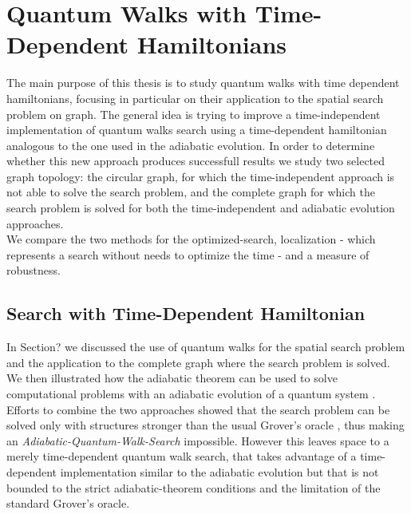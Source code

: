 \newpage
\thispagestyle{empty}
\chapter{Quantum Walks with Time-Dependent Hamiltonians}
The main purpose of this thesis is to study quantum walks with time dependent hamiltonians, focusing in particular on their application to the spatial search problem on graph. The general idea is trying to improve a time-independent implementation of quantum walks search using a time-dependent hamiltonian analogous to the one used in the adiabatic evolution. In order to determine whether this new approach produces successfull results we study two selected graph topology: the circular graph, for which the time-independent approach is not able to solve the search problem, and the complete graph for which the search problem is solved for both the time-independent and adiabatic evolution approaches. \\ We compare the two methods for the optimized-search, localization - which represents a search without needs to optimize the time - and a measure of robustness.

\section{Search with Time-Dependent Hamiltonian}
In Section? we discussed the use of quantum walks for the spatial search problem \cite{Childs2004} and the application to the complete graph where the search problem is solved. We then illustrated how the adiabatic theorem can be used to solve computational problems with an adiabatic evolution of a quantum system \cite{Farhi2000}. Efforts to combine the two approaches showed that the search problem can be solved only with structures stronger than the usual Grover's oracle \cite{Wong2016}, thus making an \textit{Adiabatic-Quantum-Walk-Search} impossible. However this leaves space to a merely time-dependent quantum walk search, that takes advantage of a time-dependent implementation similar to the adiabatic evolution but that is not bounded to the strict adiabatic-theorem conditions and the limitation of the standard Grover's oracle.


